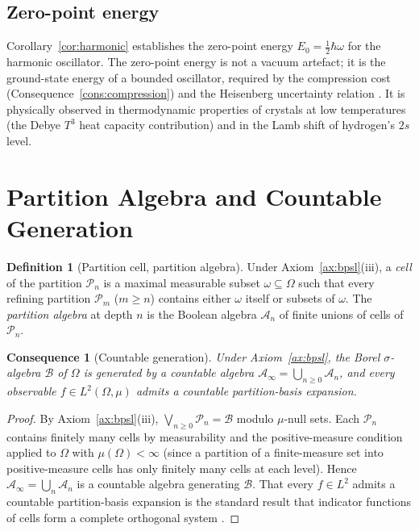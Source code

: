 \documentclass[11pt,twocolumn,a4paper]{article}
\theoremstyle{axiomstyle}
\theoremstyle{conseqstyle}
\newtheorem{consequence}{Consequence}
\theoremstyle{definition}
\newtheorem{definition}{Definition}
\theoremstyle{remark}
\newcommand{\Partition}{\mathcal{P}}
\begin{document}
\subsection{Zero-point energy}

Corollary~\ref{cor:harmonic} establishes the zero-point energy $E_{0}=\tfrac{1}{2}\hbar\omega$ for the harmonic oscillator. The zero-point energy is not a vacuum artefact; it is the ground-state energy of a bounded oscillator, required by the compression cost (Consequence~\ref{cons:compression}) and the Heisenberg uncertainty relation \citep{heisenberg1927}. It is physically observed in thermodynamic properties of crystals at low temperatures (the Debye $T^{3}$ heat capacity contribution) and in the Lamb shift of hydrogen's $2s$ level.

\section{Partition Algebra and Countable Generation}
\label{sec:partitionalgebra}

\begin{definition}[Partition cell, partition algebra]
\label{def:partition}
Under Axiom~\ref{ax:bpsl}(iii), a \emph{cell} of the partition $\Partition_{n}$ is a maximal measurable subset $\omega\subseteq\Omega$ such that every refining partition $\Partition_{m}$ ($m\ge n$) contains either $\omega$ itself or subsets of $\omega$. The \emph{partition algebra} at depth $n$ is the Boolean algebra $\mathcal{A}_{n}$ of finite unions of cells of $\Partition_{n}$.
\end{definition}

\begin{consequence}[Countable generation]
\label{cons:partitionalgebra}
Under Axiom~\ref{ax:bpsl}, the Borel $\sigma$-algebra $\mathcal{B}$ of $\Omega$ is generated by a countable algebra $\mathcal{A}_{\infty}=\bigcup_{n\ge 0}\mathcal{A}_{n}$, and every observable $f\in L^{2}(\Omega,\mu)$ admits a countable partition-basis expansion.
\end{consequence}

\begin{proof}
By Axiom~\ref{ax:bpsl}(iii), $\bigvee_{n\ge 0}\Partition_{n}=\mathcal{B}$ modulo $\mu$-null sets. Each $\Partition_{n}$ contains finitely many cells by measurability and the positive-measure condition applied to $\Omega$ with $\mu(\Omega)<\infty$ (since a partition of a finite-measure set into positive-measure cells has only finitely many cells at each level). Hence $\mathcal{A}_{\infty}=\bigcup_{n}\mathcal{A}_{n}$ is a countable algebra generating $\mathcal{B}$. That every $f\in L^{2}$ admits a countable partition-basis expansion is the standard result that indicator functions of cells form a complete orthogonal system \citep{halmos1950,rudin1987}.
\end{proof}
\end{document}

